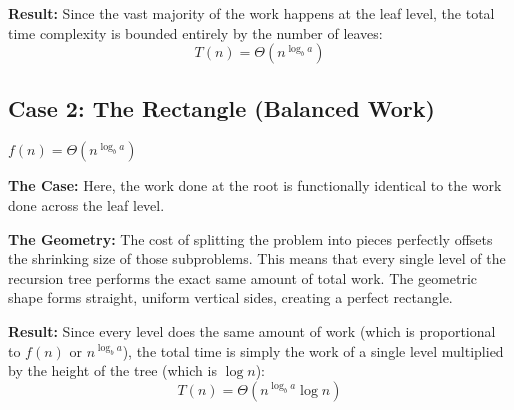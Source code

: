 \textbf{Result:} Since the vast majority of the work happens at the leaf level, the total time complexity is bounded entirely by the number of leaves: 
\begin{equation*}
    T(n) = \Theta(n^{\log_b a})
\end{equation*}

\vspace{0.5cm}
\begin{center}
\end{center}
\vspace{1cm}

\subsection{Case 2: The Rectangle (Balanced Work)}

\begin{tcolorbox}[colback=accent3!10, colframe=accent3, title=\textbf{Condition}]
$f(n) = \Theta(n^{\log_b a})$
\end{tcolorbox}
\textbf{The Case:} Here, the work done at the root is functionally identical to the work done across the leaf level.

\textbf{The Geometry:} The cost of splitting the problem into pieces perfectly offsets the shrinking size of those subproblems. This means that every single level of the recursion tree performs the exact same amount of total work. The geometric shape forms straight, uniform vertical sides, creating a perfect rectangle.

\textbf{Result:} Since every level does the same amount of work (which is proportional to $f(n)$ or $n^{\log_b a}$), the total time is simply the work of a single level multiplied by the height of the tree (which is $\log n$):
\begin{equation*}
    T(n) = \Theta(n^{\log_b a} \log n)
\end{equation*}

